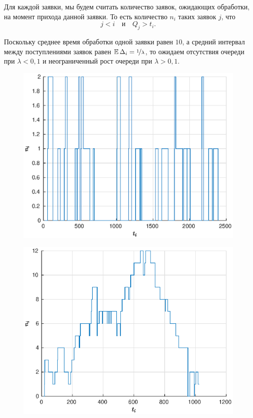 Для каждой заявки, мы будем считать количество заявок, ожидающих обработки, на момент прихода данной заявки. То есть количество $n_i$ таких заявок $j$, что
$$
        j < i
        \quad
        \mbox{и}
        \quad
        Q_j > t_i.
$$

Поскольку среднее время обработки одной заявки равен $10$, а средний интервал между поступлениями заявок равен $\mathbb{E}\,\Delta_i = \nicefrac{1}{\lambda}$, то ожидаем отсутствия очереди при $\lambda < 0,\!1$ и неограниченный рост очереди при $\lambda > 0,\!1$.

\clearpage
\begin{figure}[t]
        \noindent
        \centering
        {
        \includegraphics[width=120mm]{task_11/1-l-0-05.eps}}
        \caption{}
\end{figure}
\begin{figure}[b]
\noindent
        \centering
        {
        \includegraphics[width=120mm]{task_11/1-l-0-1.eps}}
        \caption{}
\end{figure}
